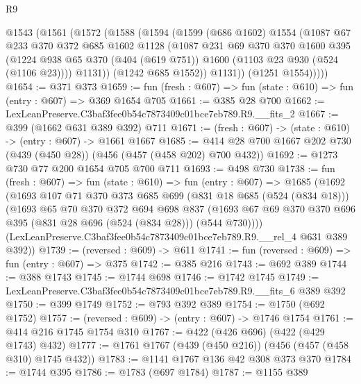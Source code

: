 \begin{lexlean}{R9}
\begin{coremodule}
      @1543
        (@1561
          (@1572
            (@1588
              (@1594
                (@1599
                  (@686 @1602)
                  @1554
                  (@1087
                    @67
                    @233
                    @370
                    @372
                    @685
                    @1602
                    @1128
                    (@1087
                      @231
                      @69
                      @370
                      @370
                      @1600
                      @395
                      (@1224
                        @938
                        @65
                        @370
                        (@404 (@619 @751))
                        @1600
                        (@1103 @23 @930 (@524 (@1106 @23))))
                      @1131))
                  (@1242 @685 @1552))
                @1131))
            (@1251 @1554)))))
@1654 := @371 @373
@1659 := fun (fresh : @607) => fun (state : @610) => fun (entry : @607) => @369 @1654 @705
@1661 := @385 @28 @700
@1662 := LexLeanPreserve.C3baf3fee0b54c7873409c01bce7eb789.R9.__fits_2
@1667 := @399 (@1662 @631 @389 @392) @711
@1671 := (fresh : @607) -> (state : @610) -> (entry : @607) -> @1661 @1667
@1685 := @414 @28 @700 @1667 @202 @730 (@439 (@450 @28)) (@456 (@457 (@458 @202) @700 @432))
@1692 := @1273 @730 @77 @200 @1654 @705 @700 @711
@1693 := @498 @730
@1738 := fun (fresh : @607) =>
  fun (state : @610) =>
  fun (entry : @607) =>
  @1685
    (@1692
      (@1693
        @107
        @71
        @370
        @373
        @685
        @699
        (@831 @18 @685 (@524 (@834 @18)))
        (@1693
          @65
          @70
          @370
          @372
          @694
          @698
          @837
          (@1693 @67 @69 @370 @370 @696 @395 (@831 @28 @696 (@524 (@834 @28))) (@544 @730))))
      (LexLeanPreserve.C3baf3fee0b54c7873409c01bce7eb789.R9.__rel_4 @631 @389 @392))
@1739 := (reversed : @609) -> @611
@1741 := fun (reversed : @609) => fun (entry : @607) => @375
@1742 := @385 @216
@1743 := @692 @389
@1744 := @388 @1743
@1745 := @1744 @698
@1746 := @1742 @1745
@1749 := LexLeanPreserve.C3baf3fee0b54c7873409c01bce7eb789.R9.__fits_6 @389 @392
@1750 := @399 @1749
@1752 := @793 @392 @389
@1754 := @1750 (@692 @1752)
@1757 := (reversed : @609) -> (entry : @607) -> @1746 @1754
@1761 := @414 @216 @1745 @1754 @310
@1767 := @422 (@426 @696) (@422 (@429 @1743) @432)
@1777 := @1761 @1767 (@439 (@450 @216)) (@456 (@457 (@458 @310) @1745 @432))
@1783 := @1141 @1767 @136 @42 @308 @373 @370
@1784 := @1744 @395
@1786 := @1783 (@697 @1784)
@1787 := @1155 @389

\end{coremodule}
\end{lexlean}
